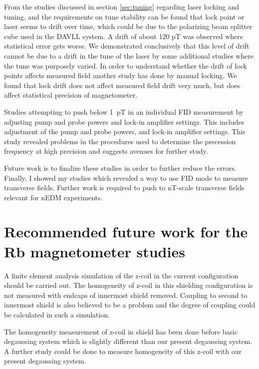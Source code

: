   From the studies discussed in section \ref{sec:tuning} regarding laser locking and tuning, and the requirements on
  tune stability can be found that
    lock point or laser seems to drift over time, which could be due to the polarizing beam splitter cube used in the DAVLL system.  A drift of
     about 120 pT was observed where statistical error gets worse.  We 
     demonstrated conclusively that this level of drift cannot be due to a drift in the tune of the laser by some additional studies where the tune was purposely varied. In order to understand 
   whether the drift of lock points affects measured
      field another study has done by manual locking. We found that lock drift does not affect measured field
      drift very much, but does affect statistical precision of
      magnetometer.

 Studies attempting to push below 1~pT in an individual FID
  measurement by adjusting pump and probe powers and lock-in amplifier
  settings.  This includes adjustment of the pump and probe powers,
  and lock-in amplifier settings.  This study revealed problems in the
  procedures used to determine the precession frequency at high
  precision and suggests avenues for further study.

  Future work is to finalize these studies in order to further reduce
  the errors.
 Finally, I showed my studies which revealed a way to use FID
  mode to measure transverse fields.  Further work is required to push
  to nT-scale transverse fields relevant for nEDM experiments.

\section{Recommended future work for the Rb magnetometer studies}

A finite element analysis simulation of the z-coil in the current configuration should be carried out.  The homogeneity of z-coil in this shielding configuration is not  measured with endcaps of innermost shield removed.  Coupling to second to innermost shield is also believed to be a problem and the degree of coupling could be calculated in such a simulation.

The homogeneity measurement of z-coil in shield  has been done before basic degaussing system which is slightly different than our present degaussing system. A further study could be done to measure homogeneity of this z-coil with our present degaussing system.


